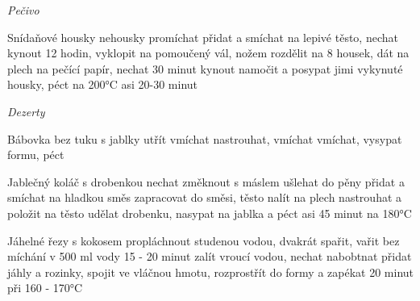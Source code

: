 \documentclass[12pt,a4paper]{article}
\begin{document}
\vspace*{\fill}
\hfill {\Huge\it Pečivo}\hfill
\vspace*{\fill}
\newpage

\begin{recipe}{Snídaňové housky nehousky}
   promíchat
   přidat a smíchat na lepivé těsto, nechat kynout 12 hodin, vyklopit na pomoučený vál, nožem rozdělit na 8 housek, dát na plech na pečící papír, nechat 30 minut kynout
   namočit a posypat jimi vykynuté housky, péct na 200°C asi 20-30 minut
\end{recipe}
\newpage

\vspace*{\fill}
\hfill {\Huge\it Dezerty}\hfill
\vspace*{\fill}
\newpage

\begin{recipe}{Bábovka bez tuku s jablky}
   utřít
   vmíchat
   nastrouhat, vmíchat
   vmíchat, vysypat formu, péct
\end{recipe}
\newpage

\begin{recipe}{Jablečný koláč s drobenkou}
   nechat změknout
   s máslem ušlehat do pěny
   přidat a smíchat na hladkou směs
   zapracovat do směsi, těsto nalít na plech
   nastrouhat a položit na těsto
   udělat drobenku, nasypat na jablka a péct asi 45 minut na 180°C
\end{recipe}
\newpage

\begin{recipe}{Jáhelné řezy s kokosem}
   propláchnout studenou vodou, dvakrát spařit, vařit bez míchání v 500 ml vody 15 - 20 minut
   zalít vroucí vodou, nechat nabobtnat
   přidat jáhly a rozinky, spojit ve vláčnou hmotu, rozprostřít do formy a zapékat 20 minut při 160 - 170°C
\end{recipe}
\newpage
\end{document}

